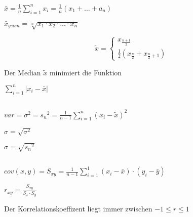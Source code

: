 \documentclass[10pt,a4paper,landscape]{article}
\begin{document}
\begin{multicols*}{4}

\section{}
\subsection{}

\parbox{\columnwidth}{\centering$\bar{x}=\frac{1}{n}\sum \limits_{i=1}^n x_i=\frac{1}{n}(x_1 + \dots + a_n)$}

\parbox{\columnwidth}{\centering$\bar{x}_{geom} = \sqrt[n]{x_1 \cdot x_2 \cdot \dots \cdot x_n}$}

\parbox{\columnwidth}{\centering\[\tilde{x}=\begin{cases}x_{\frac{n+1}{2}}\\\frac{1}{2}(x_{\frac{n}{2}}+x_{\frac{n}{2}+1})\end{cases}\]}
Der Median $\tilde{x}$ minimiert die Funktion
\parbox{\columnwidth}{\centering$\sum \limits_{i=1}^n|x_i- \bar{x}|$}

\subsection{}

\parbox{\columnwidth}{\centering$var = \sigma^2 = {s_n}^2 = \frac{1}{n-1} \sum \limits_{i=1}^n(x_i-\tilde{x})^2$}

\parbox{\columnwidth}{\centering$\sigma = \sqrt{\sigma^2}$}
\parbox{\columnwidth}{\centering$\sigma = \sqrt{{s_n}^2}$}

\subsection{}

\parbox{\columnwidth}{\centering$cov(x,y) = S_{xy} = \frac{1}{n-1}\sum \limits_{i=1}^1(x_i-\bar{x})\cdot(y_i-\bar{y})$}

\parbox{\columnwidth}{\centering$r_{xy} = \frac{S_{xy}}{S_x \cdot S_y}$}
Der Korrelationskoeffizent liegt immer zwischen $-1 \leq r \leq 1$


\end{multicols*}
\end{document}
